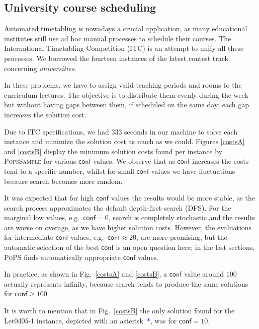 \documentclass{ws-ijait}
\begin{document}
\subsection{University course scheduling\label{ITC}}

Automated timetabling is nowadays a crucial application, as
many educational institutes still use ad hoc manual
processes to schedule their courses. The International
Timetabling Competition (ITC) is an attempt to unify all
these processes. We borrowed the fourteen instances of the
latest contest track concerning
\emph{universities}.\cite{itc-agenda}

In these problems, we have to assign valid teaching periods
and rooms to the curriculum lectures. The objective is to
distribute them evenly during the week but without having
gaps between them, if scheduled on the same day; each gap
increases the solution cost.\cite{pothitos-ictai2012}

Due to ITC specifications, we had 333 seconds in our machine
to solve each instance and minimize the solution cost as
much as we could. Figures \ref{costsA} and \ref{costsB}
display the minimum solution costs found per instance by
\textsc{PopsSample} for various $\mathsf{conf}$ values. We
observe that as $\mathsf{conf}$ increases the costs tend to
a specific number, whilst for small $\mathsf{conf}$ values
we have fluctuations because search becomes more random.

It was expected that for high $\mathsf{conf}$ values the
results would be more stable, as the search process
approximates the default depth-first-search (DFS). For the
marginal low values, e.g.\ $\mathsf{conf} = 0$, search is
completely stochastic and the results are worse on overage,
as we have higher solution costs. However, the evaluations
for intermediate $\mathsf{conf}$ values, e.g.\ 
$\mathsf{conf} \approx 20$, are more promising, but the
automatic selection of the best $\mathsf{conf}$ is an open
question here; in the last sections, \textsc{PoPS} finds
automatically appropriate $\mathsf{conf}$ values.

In practice, as shown in Fig.\ \ref{costsA} and
\ref{costsB}, a $\mathsf{conf}$ value around $100$ actually
represents infinity, because search tends to produce the
same solutions for $\mathsf{conf} \geq 100$.

It is worth to mention that in Fig.~\ref{costsB} the only
solution found for the \textsf{Let0405-1} instance, depicted
with an asterisk~\textcolor{blue}{$*$}, was for
$\mathsf{conf} = 10$.
\end{document}
